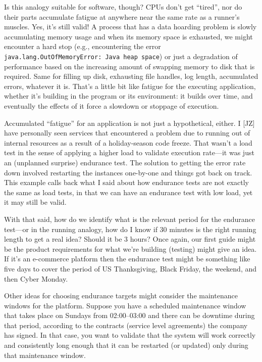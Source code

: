 Is this analogy suitable for software, though? CPUs don't get ``tired'', nor do their parts accumulate fatigue at anywhere near the same rate as a runner's muscles. Yes, it's still valid! A process that has a data hoarding problem is slowly accumulating memory usage and when its memory space is exhausted, we might encounter a hard stop (e.g., encountering the error \texttt{java.lang.OutOfMemoryError: Java heap space}) or just a degradation of performance based on the increasing amount of swapping memory to disk that is required. Same for filling up disk, exhausting file handles, log length, accumulated errors, whatever it is. That's a little bit like fatigue for the executing application, whether it's building in the program or its environment: it builds over time, and eventually the effects of it force a slowdown or stoppage of execution. 

Accumulated ``fatigue'' for an application is not just a hypothetical, either. I [JZ] have personally seen services that encountered a problem due to running out of internal resources as a result of a holiday-season code freeze. That wasn't a load test in the sense of applying a higher load to validate execution rate---it was just an (unplanned surprise) endurance test. The solution to getting the error rate down involved restarting the instances one-by-one and things got back on track. This example calls back what I said about how endurance tests are not exactly the same as load tests, in that we can have an endurance test with low load, yet it may still be valid.

With that said, how do we identify what is the relevant period for the endurance test---or in the running analogy, how do I know if 30 minutes is the right running length to get a real idea? Should it be 3 hours? Once again, our first guide might be the product requirements for what we're building (testing) might give an idea. If it's an e-commerce platform then the endurance test might be something like five days to cover the period of US Thanksgiving, Black Friday, the weekend, and then Cyber Monday. 

Other ideas for choosing endurance targets might consider the maintenance windows for the platform. Suppose you have a scheduled maintenance window that takes place on Sundays from 02:00--03:00 and there can be downtime during that period, according to the contracts (service level agreements) the company has signed. In that case, you want to validate that the system will work correctly and consistently long enough that it can be restarted (or updated) only during that maintenance window. 


